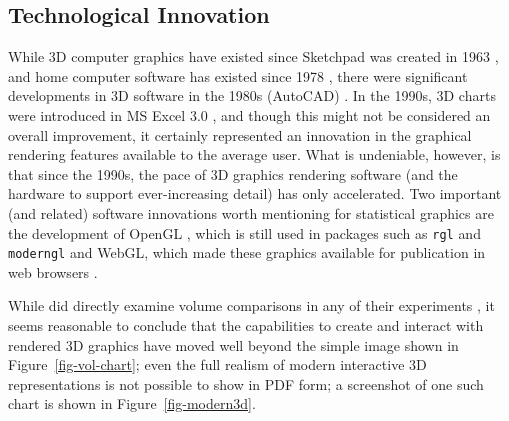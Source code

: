 \documentclass[runningheads
]{llncs}
\begin{document}
\subsection{Technological Innovation}\label{technological-innovation}

While 3D computer graphics have existed since Sketchpad was created in
1963 \autocite{sutherlandSketchpadManmachineGraphical1963}, and home
computer software has existed since 1978
\autocite{miyazawa3DARTGRAPHICS1978}, there were significant
developments in 3D software in the 1980s (AutoCAD)
\autocite{walkerAutodeskFile2017}. In the 1990s, 3D charts were
introduced in MS Excel 3.0
\autocite{walkenbachVersionsExcelExplained2021}, and though this might
not be considered an overall improvement, it certainly represented an
innovation in the graphical rendering features available to the average
user. What is undeniable, however, is that since the 1990s, the pace of
3D graphics rendering software (and the hardware to support
ever-increasing detail) has only accelerated. Two important (and
related) software innovations worth mentioning for statistical graphics
are the development of OpenGL \autocite{buss3DComputerGraphics2003},
which is still used in packages such as \texttt{rgl} \autocite{rgl} and
\texttt{moderngl} \autocite{dombiModernGL2024} and WebGL, which made
these graphics available for publication in web browsers
\autocite{parisiWebGLRunning2012,deitsMeshcatdevMeshcatpython2024}.

While \citeauthor{clevelandGraphicalPerceptionTheory1984} did directly
examine volume comparisons in any of their experiments
\autocite{clevelandGraphicalPerceptionTheory1984,clevelandGraphicalPerceptionGraphical1985,clevelandGraphicalPerceptionVisual1987},
it seems reasonable to conclude that the capabilities to create and
interact with rendered 3D graphics have moved well beyond the simple
image shown in Figure~\ref{fig-vol-chart}; even the full realism of
modern interactive 3D representations is not possible to show in PDF
form; a screenshot of one such chart is shown in
Figure~\ref{fig-modern3d}.
\end{document}
